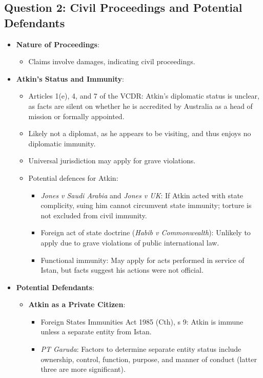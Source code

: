 \subsection{Question 2: Civil Proceedings and Potential Defendants}
\begin{itemize}
    \item \textbf{Nature of Proceedings}:
    \begin{itemize}
        \item Claims involve damages, indicating civil proceedings.
    \end{itemize}
    \item \textbf{Atkin’s Status and Immunity}:
    \begin{itemize}
        \item Articles 1(e), 4, and 7 of the VCDR: Atkin’s diplomatic status is unclear, as facts are silent on whether he is accredited by Australia as a head of mission or formally appointed.
        \item Likely not a diplomat, as he appears to be visiting, and thus enjoys no diplomatic immunity.
        \item Universal jurisdiction may apply for grave violations.
        \item Potential defences for Atkin:
        \begin{itemize}
            \item \textit{Jones v Saudi Arabia} and \textit{Jones v UK}: If Atkin acted with state complicity, suing him cannot circumvent state immunity; torture is not excluded from civil immunity.
            \item Foreign act of state doctrine (\textit{Habib v Commonwealth}): Unlikely to apply due to grave violations of public international law.
            \item Functional immunity: May apply for acts performed in service of Istan, but facts suggest his actions were not official.
        \end{itemize}
    \end{itemize}
    \item \textbf{Potential Defendants}:
    \begin{itemize}
        \item \textbf{Atkin as a Private Citizen}:
        \begin{itemize}
            \item Foreign States Immunities Act 1985 (Cth), s 9: Atkin is immune unless a separate entity from Istan.
            \item \textit{PT Garuda}: Factors to determine separate entity status include ownership, control, function, purpose, and manner of conduct (latter three are more significant).

\end{itemize}
\end{itemize}
\end{itemize}

